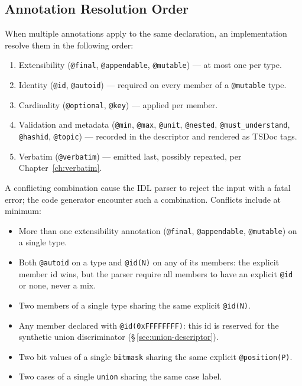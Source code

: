 \documentclass{../styles/zerodds-vendor-spec}
\begin{document}
\subsection{Annotation Resolution Order}

When multiple annotations apply to the same declaration, an
implementation  resolve them in the following order:

\begin{enumerate}
  \item Extensibility (\texttt{@final}, \texttt{@appendable},
        \texttt{@mutable}) — at most one per type.
  \item Identity (\texttt{@id}, \texttt{@autoid}) — required on
        every member of a \texttt{@mutable} type.
  \item Cardinality (\texttt{@optional}, \texttt{@key}) — applied
        per member.
  \item Validation and metadata (\texttt{@min}, \texttt{@max},
        \texttt{@unit}, \texttt{@nested}, \texttt{@must\_understand},
        \texttt{@hashid}, \texttt{@topic}) — recorded in the
        descriptor and rendered as TSDoc tags.
  \item Verbatim (\texttt{@verbatim}) — emitted last, possibly
        repeated, per Chapter~\ref{ch:verbatim}.
\end{enumerate}

A conflicting combination  cause the IDL parser to
reject the input with a fatal error; the code generator
 encounter such a combination. Conflicts include
at minimum:

\begin{itemize}[noitemsep]
  \item More than one extensibility annotation
        (\texttt{@final}, \texttt{@appendable}, \texttt{@mutable})
        on a single type.
  \item Both \texttt{@autoid} on a type and \texttt{@id(N)} on
        any of its members: the explicit member id wins, but the
        parser  require all members to have an
        explicit \texttt{@id} or none, never a mix.
  \item Two members of a single type sharing the same explicit
        \texttt{@id(N)}.
  \item Any member declared with \texttt{@id(0xFFFFFFFF)}: this
        id is reserved for the synthetic union discriminator
        (\S\,\ref{sec:union-descriptor}).
  \item Two bit values of a single \texttt{bitmask} sharing the
        same explicit \texttt{@position(P)}.
  \item Two cases of a single \texttt{union} sharing the same
        case label.
\end{itemize}
\end{document}
